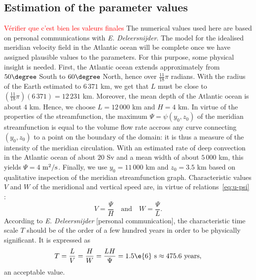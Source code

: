 \subsection{Estimation of the parameter values}
\textcolor{red}{Vérifier que c'est bien les valeurs finales}
The numerical values used here are based on personal communications with \textit{E. Deleersnijder}.
The model for the idealised meridian velocity field in the Atlantic ocean will be complete once we have assigned plausible values to the parameters. For this purpose, some physical insight is needed. First, the Atlantic ocean extends approximately from $50\degree$ South to $60\degree$ North, hence over $\frac{11}{18}\pi$ radians. With the radius of the Earth estimated to $6\,371$ km, we get that $L$ must be close to $(\frac{11}{18}\pi) (6\,371) = 12\, 231$ km. Moreover, the mean depth of the Atlantic ocean is about $4$ km. Hence, we choose $L = 12\,000$ km and $H = 4$ km. In virtue of the properties of the streamfunction, the maximum $\Psi = \psi(y_0,z_0)$ of the meridian streamfunction is equal to the volume flow rate accross any curve connecting $(y_0,z_0)$ to a point on the boundary of the domain: it is thus a measure of the intensity of the meridian circulation. With an estimated rate of deep convection in the Atlantic ocean of about $20$ Sv and a mean width of about $5\,000$ km, this yields $\Psi = 4$ $\rm{m^2/s}$. Finally, we use $y_0 = 11\,000$ km and $z_0 = 3.5$ km based on qualitative inspection of the meridian streamfunction graph. Characteristic values $V$ and $W$ of the meridional and vertical speed are, in virtue of relations~\eqref{eq:u-psi} :
\begin{equation}\label{eq:VW}
	V = \frac{\Psi}{H} \quad \mbox{and} \quad W = \frac{\Psi}{L}.
\end{equation}
According to \textit{E. Deleersnijder} [personal communication], the characteristic time scale $T$ should be of the order of a few hundred years in order to be physically significant. It is expressed as
\begin{equation} \label{eq:T}
	T = \frac{L}{V} = \frac{H}{W} = \frac{LH}{\Psi} = 1.5\e{6} \mbox{ s} \approx 475.6 \mbox{ years},
\end{equation}
an acceptable value.

